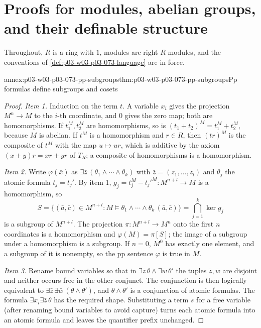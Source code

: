 \section{Proofs for modules, abelian groups, and their definable structure}
\label{sec:annex-p03-w03-p03-073-modules}

Throughout, \(R\) is a ring with \(1\), modules are right \(R\)-modules,
and the conventions of \cref{def:p03-w03-p03-073-language} are in force.

\begin{annexitem}{annex:p03-w03-p03-073-pp-subgroups}{thm:p03-w03-p03-073-pp-subgroups}{Pp formulas define subgroups and cosets}
\begin{proof}
\emph{Item 1.} Induction on the term \(t\). A variable \(x_i\) gives the
projection \(M^n\to M\) to the \(i\)-th coordinate, and \(0\) gives the
zero map; both are homomorphisms. If \(t_1^M,t_2^M\) are homomorphisms, so
is \((t_1+t_2)^M=t_1^M+t_2^M\), because \(M\) is abelian. If \(t^M\) is a
homomorphism and \(r\in R\), then \((tr)^M\) is the composite of \(t^M\)
with the map \(u\mapsto ur\), which is additive by the axiom
\((x+y)r=xr+yr\) of \(T_R\); a composite of homomorphisms is a
homomorphism.

\emph{Item 2.} Write \(\varphi(\bar x)\) as
\(\exists\bar z\,(\theta_1\wedge\cdots\wedge\theta_k)\) with
\(\bar z=(z_1,\ldots,z_l)\) and \(\theta_j\) the atomic formula
\(t_j=t_j'\). By item 1, \(g_j=t_j^M-t_j'^M:M^{n+l}\to M\) is a
homomorphism, so
\[
 S=\{(\bar a,\bar c)\in M^{n+l}:M\models\theta_1\wedge\cdots\wedge\theta_k\,(\bar a,\bar c)\}
 =\bigcap_{j=1}^k\ker g_j
\]
is a subgroup of \(M^{n+l}\). The projection \(\pi:M^{n+l}\to M^n\) onto the
first \(n\) coordinates is a homomorphism and \(\varphi(M)=\pi[S]\); the
image of a subgroup under a homomorphism is a subgroup. If \(n=0\),
\(M^0\) has exactly one element, and a subgroup of it is nonempty, so the
pp sentence \(\varphi\) is true in \(M\).

\emph{Item 3.} Rename bound variables so that in
\(\exists\bar z\,\theta\wedge\exists\bar w\,\theta'\) the tuples
\(\bar z,\bar w\) are disjoint and neither occurs free in the other
conjunct. The conjunction is then logically equivalent to
\(\exists\bar z\,\exists\bar w\,(\theta\wedge\theta')\), and
\(\theta\wedge\theta'\) is a conjunction of atomic formulas. The formula
\(\exists x_i\exists\bar z\,\theta\) has the required shape. Substituting
a term \(s\) for a free variable (after renaming bound variables to avoid
capture) turns each atomic formula into an atomic formula and leaves the
quantifier prefix unchanged.


\end{proof}
\end{annexitem}
